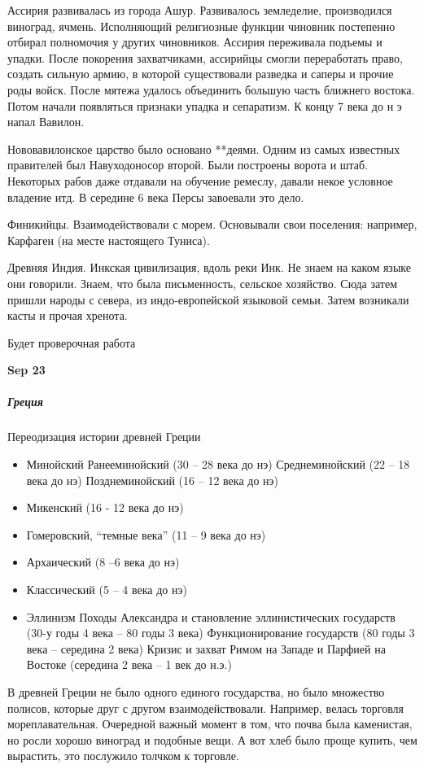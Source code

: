\documentclass[a4paper, 12pt]{article}
\def\dateis#1{\vspace{\baselineskip}\hfill\textbf{#1}\par}
\begin{document}
\begin{multicols}{2}
Ассирия развивалась из города Ашур. Развивалось земледелие, производился виноград, ячмень. Исполняющий религиозные функции чиновник постепенно отбирал полномочия у других чиновников. Ассирия переживала подъемы и упадки. После покорения захватчиками, ассирийцы смогли переработать право, создать сильную армию, в которой существовали разведка и саперы и прочие роды войск. После мятежа удалось объединить большую часть ближнего востока. Потом начали появляться признаки упадка и сепаратизм. К концу 7 века до н э напал Вавилон. 

Нововавилонское царство было основано **деями. Одним из самых известных правителей был Навуходоносор второй. Были построены ворота и штаб. Некоторых рабов даже отдавали на обучение ремеслу, давали некое условное владение итд. В середине 6 века Персы завоевали это дело. 

Финикийцы. Взаимодействовали с морем. Основывали свои поселения: например, Карфаген (на месте настоящего Туниса). 

Древняя Индия. Инкская цивилизация, вдоль реки Инк. Не знаем на каком языке они говорили. Знаем, что была письменность, сельское хозяйство. Сюда затем пришли народы с севера, из индо-европейской языковой семьи. Затем возникали касты и прочая хренота. 

Будет проверочная работа


\dateis{Sep 23}

\subparagraph{Греция}
Переодизация истории древней Греции
\begin{itemize}[nolistsep]
\item Минойский 
 \subitem Ранееминойский (30 -- 28 века до нэ)
 \subitem Среднеминойский (22 -- 18 века до нэ)
 \subitem Позднеминойский (16 -- 12 века до нэ)
\item Микенский (16 - 12 века до нэ)
\item Гомеровский, ``темные века'' (11 -- 9 века до нэ)
\item Архаический (8 --6 века до нэ)
\item Классический (5 -- 4 века до нэ)
\item Эллинизм
 \subitem Походы Александра и становление эллинистических государств (30-у годы 4 века -- 80 годы 3 века)
 \subitem Функционирование государств (80 годы 3 века -- середина 2 века)
 \subitem Кризис и захват Римом на Западе и Парфией на Востоке (середина 2 века -- 1 век до н.э.)
\end{itemize}

В древней Греции не было одного единого государства, но было множество полисов, которые друг с другом взаимодействовали. Например, велась торговля мореплавательная. Очередной важный момент в том, что почва была каменистая, но росли хорошо виноград и подобные вещи. А вот хлеб было проще купить, чем вырастить, это послужило толчком к торговле. 


\end{multicols}
\end{document}
